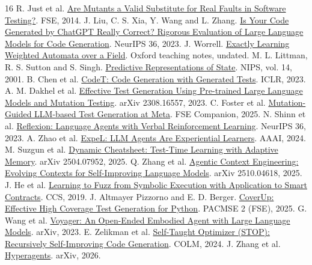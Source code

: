 \documentclass[11pt]{article}
\begin{document}
\begin{thebibliography}{16}\footnotesize
\setlength{\itemsep}{0pt}\setlength{\parskip}{0pt}
 R. Just et al. \href{https://homes.cs.washington.edu/~rjust/publ/mutants_real_faults_fse_2014.pdf}{Are Mutants a Valid Substitute for Real Faults in Software Testing?}. FSE, 2014.
 J. Liu, C. S. Xia, Y. Wang and L. Zhang. \href{https://arxiv.org/abs/2305.01210}{Is Your Code Generated by ChatGPT Really Correct? Rigorous Evaluation of Large Language Models for Code Generation}. NeurIPS 36, 2023.
 J. Worrell. \href{https://www.cs.ox.ac.uk/people/james.worrell/MA-learning.pdf}{Exactly Learning Weighted Automata over a Field}. Oxford teaching notes, undated.
 M. L. Littman, R. S. Sutton and S. Singh. \href{https://proceedings.neurips.cc/paper/2001/file/1e4d36177d71bbb3558e43af9577d70e-Paper.pdf}{Predictive Representations of State}. NIPS, vol. 14, 2001.
 B. Chen et al. \href{https://arxiv.org/abs/2207.10397}{CodeT: Code Generation with Generated Tests}. ICLR, 2023.
 A. M. Dakhel et al. \href{https://arxiv.org/abs/2308.16557}{Effective Test Generation Using Pre-trained Large Language Models and Mutation Testing}. arXiv 2308.16557, 2023.
 C. Foster et al. \href{https://arxiv.org/abs/2501.12862}{Mutation-Guided LLM-based Test Generation at Meta}. FSE Companion, 2025.
 N. Shinn et al. \href{https://arxiv.org/abs/2303.11366}{Reflexion: Language Agents with Verbal Reinforcement Learning}. NeurIPS 36, 2023.
 A. Zhao et al. \href{https://arxiv.org/abs/2308.10144}{ExpeL: LLM Agents Are Experiential Learners}. AAAI, 2024.
 M. Suzgun et al. \href{https://arxiv.org/abs/2504.07952}{Dynamic Cheatsheet: Test-Time Learning with Adaptive Memory}. arXiv 2504.07952, 2025.
 Q. Zhang et al. \href{https://arxiv.org/abs/2510.04618}{Agentic Context Engineering: Evolving Contexts for Self-Improving Language Models}. arXiv 2510.04618, 2025.
 J. He et al. \href{https://doi.org/10.1145/3319535.3363230}{Learning to Fuzz from Symbolic Execution with Application to Smart Contracts}. CCS, 2019.
 J. Altmayer Pizzorno and E. D. Berger. \href{https://arxiv.org/abs/2403.16218v4}{CoverUp: Effective High Coverage Test Generation for Python}. PACMSE 2 (FSE), 2025.
 G. Wang et al. \href{https://arxiv.org/abs/2305.16291v2}{Voyager: An Open-Ended Embodied Agent with Large Language Models}. arXiv, 2023.
 E. Zelikman et al. \href{https://arxiv.org/abs/2310.02304v3}{Self-Taught Optimizer (STOP): Recursively Self-Improving Code Generation}. COLM, 2024.
 J. Zhang et al. \href{https://arxiv.org/abs/2603.19461v1}{Hyperagents}. arXiv, 2026.
\end{thebibliography}
\end{document}
